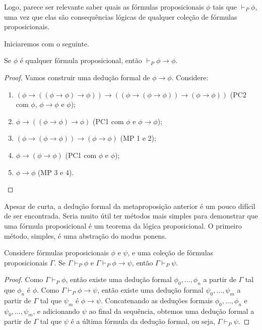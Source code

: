 Logo, parece ser relevante saber quais as fórmulas proposicionais $\phi$ tais que $\vdash_P \phi$, uma vez que elas são consequências lógicas de qualquer coleção de fórmulas proposicionais.

Iniciaremos com o seguinte.

\begin{metaproposition}\label{metaprop:PCreflexividade}Se $\phi$ é qualquer fórmula proposicional, então $\vdash_P \phi \rightarrow \phi$.
\end{metaproposition}
\begin{proof}Vamos construir uma dedução formal de $\phi \rightarrow \phi$.
    Considere:

    \begin{enumerate}
        \item $(\phi \rightarrow ((\phi \rightarrow \phi) \rightarrow \phi)) \rightarrow ((\phi \rightarrow (\phi \rightarrow \phi)) \rightarrow (\phi \rightarrow \phi))$ (PC2 com $\phi$, $\phi\rightarrow \phi$ e $\phi$);
        \item $\phi \rightarrow ((\phi \rightarrow \phi) \rightarrow \phi)$ (PC1 com $\phi$ e $\phi\rightarrow \phi$);
        \item $(\phi \rightarrow (\phi \rightarrow \phi)) \rightarrow (\phi \rightarrow \phi)$ (MP 1 e 2);
        \item $\phi \rightarrow (\phi \rightarrow \phi)$ (PC1 com $\phi$ e $\phi$);
        \item $\phi \rightarrow \phi$ (MP 3 e 4).
    \end{enumerate}
\end{proof}
Apesar de curta, a dedução formal da metaproposição anterior é um pouco difícil de ser encontrada.
Seria muito útil ter métodos mais simples para demonstrar que uma fórmula proposicional é um teorema da lógica proposicional.
O primeiro método, simples, é uma abstração do modus ponens.
\begin{metaproposition}\label{metaprop:PCmodusPonens}Considere fórmulas proposicionais $\phi$ e $\psi$, e uma coleção de fórmulas proposicionais $\Gamma$.
Se $\Gamma \vdash_P \phi$ e $\Gamma \vdash_P \phi \rightarrow \psi$, então $\Gamma \vdash_P \psi$.
\end{metaproposition}
\begin{proof}Como $\Gamma \vdash_P \phi$, então existe uma dedução formal $\phi_0, \dots, \phi_n$ a partir de $\Gamma$ tal que $\phi_n$ é $\phi$.
Como $\Gamma \vdash_P \phi \rightarrow \psi$, então existe uma dedução formal $\psi_0, \dots, \psi_m$ a partir de $\Gamma$ tal que $\psi_m$ é $\phi \rightarrow \psi$.
Concatenando as deduções formais $\phi_0, \dots, \phi_n$ e $\psi_0, \dots, \psi_m$, e adicionando $\psi$ ao final da sequência, obtemos uma dedução formal a partir de $\Gamma$ tal que $\psi$ é a última fórmula da dedução formal, ou seja, $\Gamma \vdash_P \psi$.
\end{proof}

